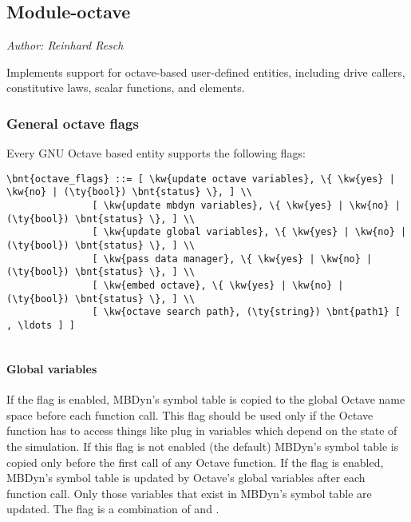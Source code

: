 \subsection{Module-octave}
\emph{Author: Reinhard Resch}

\noindent
Implements support for octave-based user-defined entities, including
drive callers, constitutive laws, scalar functions, and elements.

\subsubsection{General octave flags}
Every GNU Octave based entity supports the following flags:
\begin{Verbatim}[commandchars=\\\{\}]
	\bnt{octave_flags} ::= [ \kw{update octave variables}, \{ \kw{yes} | \kw{no} | (\ty{bool}) \bnt{status} \}, ] \\
			   [ \kw{update mbdyn variables}, \{ \kw{yes} | \kw{no} | (\ty{bool}) \bnt{status} \}, ] \\
			   [ \kw{update global variables}, \{ \kw{yes} | \kw{no} | (\ty{bool}) \bnt{status} \}, ] \\
			   [ \kw{pass data manager}, \{ \kw{yes} | \kw{no} | (\ty{bool}) \bnt{status} \}, ] \\
			   [ \kw{embed octave}, \{ \kw{yes} | \kw{no} | (\ty{bool}) \bnt{status} \}, ] \\
			   [ \kw{octave search path}, (\ty{string}) \bnt{path1} [ , \ldots ] ]
						   
\end{Verbatim}
\paragraph{Global variables}
If the flag  is enabled, MBDyn's symbol table is copied to the global Octave name space before each function call.
This flag should be used only if the Octave function has to access things like plug in variables which depend on the state of the simulation.
If this flag is not enabled (the default) MBDyn's symbol table is copied only before the first call of any Octave function.
If the flag  is enabled, MBDyn's symbol table is updated by Octave's global variables after each function call.
Only those variables that exist in MBDyn's symbol table are updated.
The flag  is a combination of  and .

